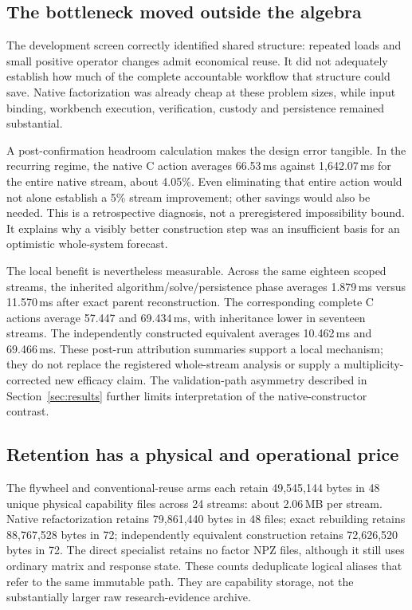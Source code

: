 \subsection{The bottleneck moved outside the algebra}

The development screen correctly identified shared structure: repeated loads and small positive operator
changes admit economical reuse. It did not adequately establish how much of the complete accountable
workflow that structure could save. Native factorization was already cheap at these problem sizes, while
input binding, workbench execution, verification, custody and persistence remained substantial.

A post-confirmation headroom calculation makes the design error tangible. In the recurring regime, the
native C action averages 66.53\,ms against 1,642.07\,ms for the entire native stream, about 4.05\%. Even
eliminating that entire action would not alone establish a 5\% stream improvement; other savings would also
be needed. This is a retrospective diagnosis, not a preregistered impossibility bound. It explains why a
visibly better construction step was an insufficient basis for an optimistic whole-system forecast.

The local benefit is nevertheless measurable. Across the same eighteen scoped streams, the inherited
algorithm/solve/persistence phase averages 1.879\,ms versus 11.570\,ms after exact parent reconstruction.
The corresponding complete C actions average 57.447 and 69.434\,ms, with inheritance lower in seventeen
streams. The independently constructed equivalent averages 10.462\,ms and 69.466\,ms. These post-run
attribution summaries support a local mechanism; they do not replace the registered whole-stream analysis
or supply a multiplicity-corrected new efficacy claim. The validation-path asymmetry described in
Section~\ref{sec:results} further limits interpretation of the native-constructor contrast.

\subsection{Retention has a physical and operational price}

The flywheel and conventional-reuse arms each retain 49,545,144 bytes in 48 unique physical capability files
across 24 streams: about 2.06\,MB per stream. Native refactorization retains 79,861,440 bytes in 48 files;
exact rebuilding retains 88,767,528 bytes in 72; independently equivalent construction retains 72,626,520
bytes in 72. The direct specialist retains no factor NPZ files, although it still uses ordinary matrix and
response state. These counts deduplicate logical aliases that refer to the same immutable path. They are
capability storage, not the substantially larger raw research-evidence archive.

